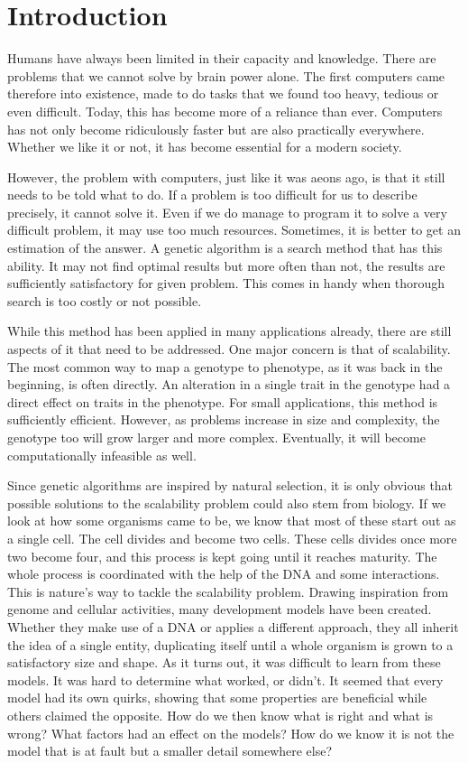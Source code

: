 \section{Introduction}
Humans have always been limited in their capacity and knowledge. There are problems that we cannot solve by brain power alone. The first computers came therefore into existence, made to do tasks that we found too heavy, tedious or even difficult. Today, this has become more of a reliance than ever. Computers has not only become ridiculously faster but are also practically everywhere. Whether we like it or not, it has become essential for a modern society.

However, the problem with computers, just like it was aeons ago, is that it still needs to be told what to do. If a problem is too difficult for us to describe precisely, it cannot solve it. Even if we do manage to program it to solve a very difficult problem, it may use too much resources. Sometimes, it is better to get an estimation of the answer. A genetic algorithm is a search method that has this ability. It may not find optimal results but more often than not, the results are sufficiently satisfactory for given problem. This comes in handy when thorough search is too costly or not possible.

While this method has been applied in many applications already, there are still aspects of it that need to be addressed. One major concern is that of scalability. The most common way to map a genotype to phenotype, as it was back in the beginning, is often directly. An alteration in a single trait in the genotype had a direct effect on traits in the phenotype. For small applications, this method is sufficiently efficient. However, as problems increase in size and complexity, the genotype too will grow larger and more complex. Eventually, it will become computationally infeasible as well.

Since genetic algorithms are inspired by natural selection, it is only obvious that possible solutions to the scalability problem could also stem from biology. If we look at how some organisms came to be, we know that most of these start out as a single cell. The cell divides and become two cells. These cells divides once more two become four, and this process is kept going until it reaches maturity. The whole process is coordinated with the help of the DNA and some interactions. This is nature's way to tackle the scalability problem. Drawing inspiration from genome and cellular activities, many development models have been created. Whether they make use of a DNA or applies a different approach, they all inherit the idea of a single entity, duplicating itself until a whole organism is grown to a satisfactory size and shape. As it turns out, it was difficult to learn from these models. It was hard to determine what worked, or didn't. It seemed that every model had its own quirks, showing that some properties are beneficial while others claimed the opposite. How do we then know what is right and what is wrong? What factors had an effect on the models? How do we know it is not the model that is at fault but a smaller detail somewhere else?

